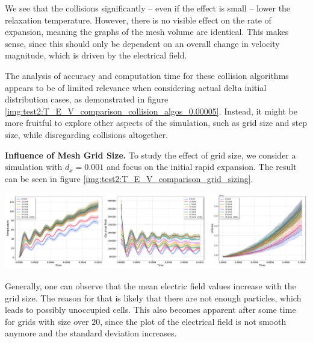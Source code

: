 We see that the collisions significantly -- even if the effect is small -- lower the relaxation temperature. However, there is no visible effect on the rate of expansion, meaning the graphs of the mesh volume are identical. This makes sense, since this should only be dependent on an overall change in velocity magnitude, which is driven by the electrical field.

The analysis of accuracy and computation time for these collision algorithms appears to be of limited relevance when considering actual delta initial distribution cases, as demonstrated in figure \ref{img:test2:T_E_V_comparison_collision_algos_0.00005}. Instead, it might be more fruitful to explore other aspects of the simulation, such as grid size and step size, while disregarding collisions altogether. 

\textbf{Influence of Mesh Grid Size.} To study the effect of grid size, we consider a simulation with $d_x = 0.001$ and focus on the initial rapid expansion. The result can be seen in figure \ref{img:test2:T_E_V_comparison_grid_sizing}. \\
\begin{minipage}[h]{\linewidth}
    \vspace{5pt}
    \centering
    \includegraphics[width=\linewidth]{ressources/test2/T_E_V_comparison_grid_sizing.pdf}
    \label{img:test2:T_E_V_comparison_grid_sizing}
    \vspace{5pt}
\end{minipage}
Generally, one can observe that the mean electric field values increase with the grid size. The reason for that is likely that there are not enough particles, which leads to possibly unoccupied cells. This also becomes apparent after some time for grids with size over $20$, since the plot of the electrical field is not smooth anymore and the standard deviation increases. 

